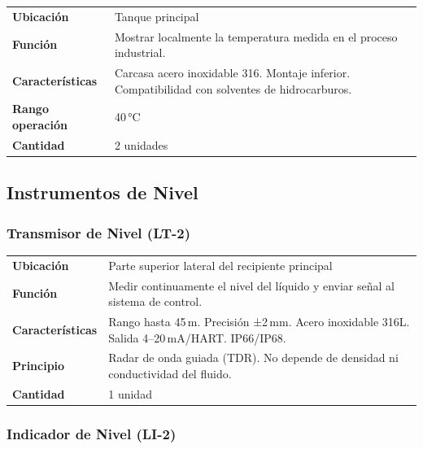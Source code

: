 \documentclass[12pt,letterpaper]{article}
\begin{document}
\begin{especbox}[title={TI — WIKA A53 Bimetálico Industrial}]
\renewcommand{\arraystretch}{1.25}
\begin{tabular}{L{4cm} L{9.5cm}}
\textbf{Ubicación}       & Tanque principal \\
\textbf{Función}         & Mostrar localmente la temperatura medida en el proceso industrial. \\
\textbf{Características} & Carcasa acero inoxidable 316. Montaje inferior. Compatibilidad con solventes de hidrocarburos. \\
\textbf{Rango operación} & 40\,°C \\
\textbf{Cantidad}        & 2 unidades \\
\end{tabular}
\end{especbox}

\subsection{Instrumentos de Nivel}

\subsubsection{Transmisor de Nivel (LT-2)}

\begin{especbox}[title={LT-2 — Endress+Hauser Levelflex FMP54}]
\renewcommand{\arraystretch}{1.25}
\begin{tabular}{L{4cm} L{9.5cm}}
\textbf{Ubicación}       & Parte superior lateral del recipiente principal \\
\textbf{Función}         & Medir continuamente el nivel del líquido y enviar señal al sistema de control. \\
\textbf{Características} & Rango hasta 45\,m. Precisión ±2\,mm. Acero inoxidable 316L. Salida 4--20\,mA/HART. IP66/IP68. \\
\textbf{Principio}       & Radar de onda guiada (TDR). No depende de densidad ni conductividad del fluido. \\
\textbf{Cantidad}        & 1 unidad \\
\end{tabular}
\end{especbox}

\subsubsection{Indicador de Nivel (LI-2)}
\end{document}
